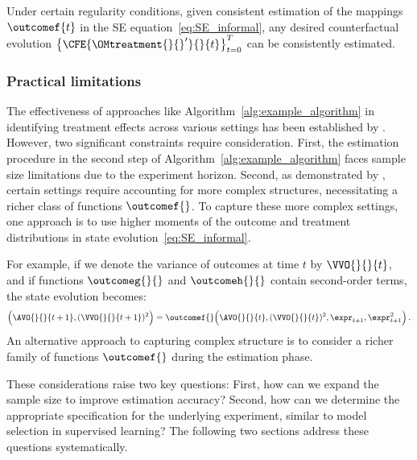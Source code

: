\begin{theorem}
\label{thm:consistency_informal}
Under certain regularity conditions, given consistent estimation of the mappings $\outcomef{t}$ in the SE equation~\eqref{eq:SE_informal}, any desired counterfactual evolution 
$\left\{ \CFE{\OMtreatment{}{}'}{}{t} \right\}_{t=0}^T$ 
can be consistently estimated.
\end{theorem}

\subsubsection{Practical limitations} 

The effectiveness of approaches like Algorithm~\ref{alg:example_algorithm} in identifying treatment effects across various settings has been established by \cite{shirani2024causal}. However, two significant constraints require consideration. First, the estimation procedure in the second step of Algorithm~\ref{alg:example_algorithm} faces sample size limitations due to the experiment horizon. Second, as demonstrated by \cite{bayati2024higher}, certain settings require accounting for more complex structures, necessitating a richer class of functions $\outcomef{}$. To capture these more complex settings, one approach is to use higher moments of the outcome and treatment distributions in state evolution~\eqref{eq:SE_informal}.

For example, if we denote the variance of outcomes at time $t$ by $\VVO{}{}{t}$, and if functions $\outcomeg{}{}$ and $\outcomeh{}{}$ contain second-order terms, the state evolution becomes:
\begin{align}
    \label{eq:more_complex_SE_function}
    \Big(\AVO{}{}{t+1},(\VVO{}{}{t+1})^2\Big)
    =\outcomef{}\Big(\AVO{}{}{t},(\VVO{}{}{t})^2,\expr_{t+1},\expr_{t+1}^2\Big)\,.
\end{align}
%
An alternative approach to capturing complex structure is to consider a richer family of functions $\outcomef{}$ during the estimation phase. 

These considerations raise two key questions: First, how can we expand the sample size to improve estimation accuracy? Second, how can we determine the appropriate specification for the underlying experiment, similar to model selection in supervised learning? The following two sections address these questions systematically.